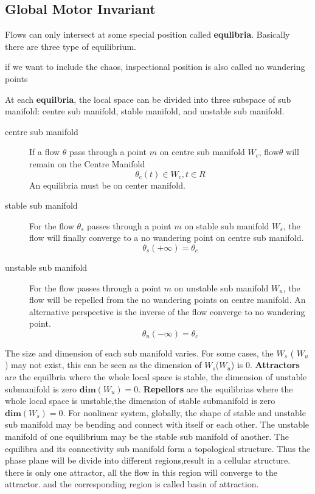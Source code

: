 \subsection{Global Motor Invariant}

Flows can only intersect at some special position called \textbf{equlibria}.
Basically there are three type of equilibrium. 

if we want to include the chaos, inspectional position is also called no wandering points

At each \textbf{equilbria}, 
the local space can be divided into three subspace of sub manifold: centre sub manifold, stable manifold, and unstable sub manifold.
\begin{description} 
\item[centre sub manifold]
If a flow $\theta$ pass through a point $m$ on centre sub manifold $W_{c}$,
flow$\theta$ will remain on the Centre Manifold 
\[
\theta_{c}(t) \in W_{c}, t \in R
\]
 An equilibria must be on center manifold. 
\item [stable sub manifold]
For the flow $\theta_{s}$ passes through a point $m$ on stable sub manifold $W_{s}$, the flow will finally converge to a no wandering point on centre sub manifold.
\[
\theta_{s}(+\infty)=\theta_{c}
\]
\item[unstable sub manifold]
For the flow passes through a point $m$ on unstable sub manifold $W_{u}$, the flow will be repelled from the no wandering points on centre manifold.
An alternative perspective is the inverse of the flow converge to no wandering point. 
\[
\theta_{u}(-\infty)=\theta_{c}
\] 

\end{description}

The size and dimension of each sub manifold varies.
For some cases, the $W_{s}$ ( $W_{u}$) may not exist, 
this can be seen as the dimension of $W_{s}$($W_{u}$) is $0$.
\textbf{Attractors} are the equilbria where the whole local space is stable, the dimension of unstable submanifold is zero $\mathbf{dim}(W_{u})=0$.
\textbf{Repellors} are the equilibrias where the whole local space is unstable,the dimension of stable submanifold is zero $\mathbf{dim}(W_{s})=0$.
For nonlinear system, globally, the shape of stable and unstable sub manifold may be bending and connect with itself or each other.
The unstable manifold of one equilibrium may be the stable sub manifold of another.
The equilibra and its connectivity sub manifold form a topological structure.
Thus the phase plane will be divide into different regions,result in a cellular structure.
there is only one attractor, all the flow in this region will converge to the attractor.
and the corresponding region is called basin of attraction.

